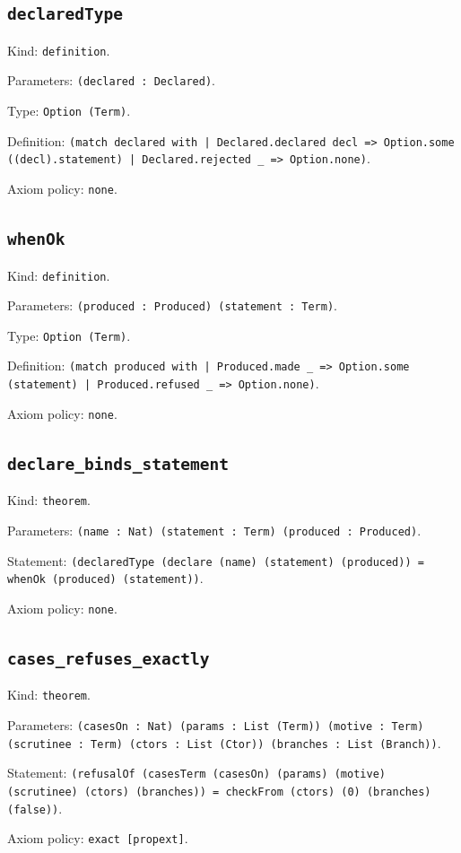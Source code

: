 \documentclass[11pt]{article}
\begin{document}
\subsection*{\texttt{declaredType}}
\noindent Kind: \texttt{definition}.\par
\noindent Parameters: \texttt{(declared : Declared)}.\par
\noindent Type: \texttt{Option (Term)}.\par
\noindent Definition: \texttt{(match declared with | Declared.declared decl => Option.some ((decl).statement) | Declared.rejected \_ => Option.none)}.\par
\noindent Axiom policy: \texttt{none}.\par
\subsection*{\texttt{whenOk}}
\noindent Kind: \texttt{definition}.\par
\noindent Parameters: \texttt{(produced : Produced) (statement : Term)}.\par
\noindent Type: \texttt{Option (Term)}.\par
\noindent Definition: \texttt{(match produced with | Produced.made \_ => Option.some (statement) | Produced.refused \_ => Option.none)}.\par
\noindent Axiom policy: \texttt{none}.\par
\subsection*{\texttt{declare\_binds\_statement}}
\noindent Kind: \texttt{theorem}.\par
\noindent Parameters: \texttt{(name : Nat) (statement : Term) (produced : Produced)}.\par
\noindent Statement: \texttt{(declaredType (declare (name) (statement) (produced)) = whenOk (produced) (statement))}.\par
\noindent Axiom policy: \texttt{none}.\par
\subsection*{\texttt{cases\_refuses\_exactly}}
\noindent Kind: \texttt{theorem}.\par
\noindent Parameters: \texttt{(casesOn : Nat) (params : List (Term)) (motive : Term) (scrutinee : Term) (ctors : List (Ctor)) (branches : List (Branch))}.\par
\noindent Statement: \texttt{(refusalOf (casesTerm (casesOn) (params) (motive) (scrutinee) (ctors) (branches)) = checkFrom (ctors) (0) (branches) (false))}.\par
\noindent Axiom policy: \texttt{exact [propext]}.\par
\end{document}
